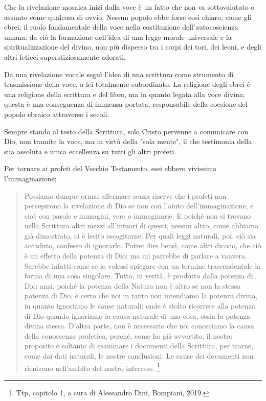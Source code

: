 Che la rivelazione mosaica inizi dalla voce è un fatto che non va sottovalutato o assunto come
qualcosa di ovvio. Nessun popolo ebbe forse così chiaro, come gli ebrei, il ruolo
fondamentale della voce nella costituzione dell'autocoscienza umana: da ciò la formazione dell'idea di una legge morale universale e la spiritualizzazione
del divino, non più disperso tra i corpi dei tori, dei leoni, e degli altri feticci
superstiziosamente adorati.

Da una rivelazione vocale seguì l'idea di una scrittura come
strumento di trasmissione della voce, a lei totalmente subordinato. La religione degli ebrei è una
religione della scrittura e del libro, ma in quanto legata alla voce divina; questa è una conseguenza di immensa portata, responsabile
della coesione del popolo ebraico attraverso i secoli.

Sempre stando al testo della Scrittura, solo Cristo pervenne a
comunicare con Dio, non tramite la voce, ma in virtù della "sola mente", il che
testimonia della sua assoluta e unica eccellenza su tutti gli altri profeti.

Per tornare ai profeti del Vecchio Testamento, essi ebbero vivissima l'immaginazione:

\begin{quotation}
	\small Possiamo dunque ormai affermare senza riserve che i profeti non percepirono la rivelazione di Dio
	se non con l'aiuto dell'immaginazione, e cioè con parole e immagini, vere o immaginarie. E poiché
	non si trovano nella Scrittura altri mezzi all'infuori di questi, nessun altro, come abbiamo già
	dimostrato, ci è lecito escogitarne. Per quali leggi naturali, poi, ciò sia accaduto, confesso di
	ignorarlo. Potrei dire bensì, come altri dicono, che ciò è un effetto della potenza di Dio; ma mi
	parrebbe di parlare a vanvera. Sarebbe infatti come se io volessi spiegare con un termine
	trascendentale la forma di una cosa singolare. Tutto, in verità, è prodotto dalla potenza di Dio: anzi,
	poiché la potenza della Natura non è altro se non la stessa potenza di Dio, è certo che noi in tanto non intendiamo la potenza divina, in quanto ignoriamo le cause naturali; onde è stolto ricorrere
	alla potenza di Dio quando ignoriamo la causa naturale di una cosa, ossia la potenza divina stessa.
	D'altra parte, non è necessario che noi conosciamo la causa della conoscenza profetica, perché,
	come ho già avvertito, il nostro proposito è soltanto di esaminare i documenti della Scrittura, per
	trarne, come dai dati naturali, le nostre conclusioni. Le cause dei documenti non rientrano
	nell'ambito del nostro interesse. \footnote{Ttp, capitolo 1, a cura di Alessandro Dini, Bompiani, 2019.}
\end{quotation}

